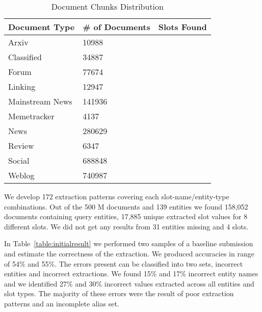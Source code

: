 \begin{table}
\caption{Document Chunks Distribution }
\centering
\label{table:documentsDist}

\begin{tabular}{|l|l|c|}
\hline 
\textbf{Document Type} & \textbf{\# of Documents} &  \textbf{Slots Found}\\ 
\hline 
Arxiv & 10988 & \\ \hline
 Classified & 34887 & \\ \hline
 Forum & 77674 & \\ \hline
 Linking & 12947 & \\ \hline
 Mainstream News & 141936 & \\ \hline
 Memetracker & 4137 & \\ \hline
 News & 280629 & \\ \hline
 Review & 6347 & \\ \hline
 Social & 688848 & \\ \hline
 Weblog & 740987 & \\ \hline
\hline 
\end{tabular} 
\end{table}


 
 
 
We develop 172 extraction patterns covering each slot-name/entity-type combinations.
Out of the 500 M documents and 139 entities we found 158,052 documents containing query entities, 17,885 unique extracted slot values for 8 different slots.
We did not get any results from 31 entities missing and 4 slots.

In Table~\ref{table:initialresult} we performed two samples of a baseline submission and estimate the correctness of the extraction.
We produced accuracies in range of  54\% and 55\%.
The errors present can be classified into two sets, incorrect entities and incorrect extractions.
We found 15\% and 17\% incorrect entity names and we identified 27\% and 30\% incorrect values extracted across all entities and slot types.
The majority of these errors were the result of poor extraction patterns and an incomplete alias set.

